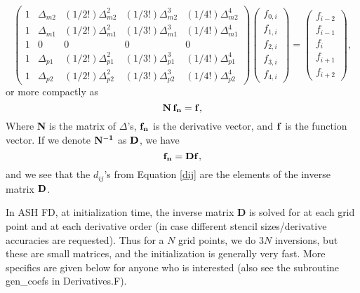\documentclass[12pt,letterpaper]{article}
\def\dfz{f_{0,i}}
\def\df{f_{1,i}}
\def\ddf{f_{2,i}}
\def\dddf{f_{3,i}}
\def\ddddf{f_{4,i}}
\begin{document}
\begin{equation}
\left( \begin{array}{ccccc} 
		1 & \Delta_{m2} & (1/2!)\Delta_{m2}^2 & (1/3!)\Delta_{m2}^3 & (1/4!)\Delta_{m2}^4 \\
		1 & \Delta_{m1} & (1/2!)\Delta_{m1}^2 & (1/3!)\Delta_{m1}^3 & (1/4!)\Delta_{m1}^4 \\
		1 & 0 & 0 & 0 & 0 \\
		1 & \Delta_{p1} & (1/2!)\Delta_{p1}^2 & (1/3!)\Delta_{p1}^3 & (1/4!)\Delta_{p1}^4 \\
		1 & \Delta_{p2} & (1/2!)\Delta_{p2}^2 & (1/3!)\Delta_{p2}^3 & (1/4!)\Delta_{p2}^4
\end{array} \right) 
\left( \begin{array}{c} 
\dfz \\ 
\df \\ 
\ddf \\ 
\dddf \\
\ddddf 
\end{array} \right)
=
\left( \begin{array}{c} 
f_{i-2} \\ 
f_{i-1} \\ 
f_{i} \\ 
f_{i+1} \\
f_{i+2} 
\end{array} \right),
\label{main_matrix}
\end{equation}
or more compactly as
\begin{equation}
\bf N\, f_n = f,
\end{equation}
Where \textbf{N} is the matrix of $\Delta$'s, $\bf f_n$ is the derivative vector, and $\bf f$ is the function vector.  If we denote $\bf N^{-1}$ as $\bf D$, we have
\begin{equation}
\bf f_n = D f,
\end{equation}
and we see that the $d_{ij}$'s from Equation \ref{dij} are the elements of the inverse matrix $\bf D$.

In ASH FD, at initialization time, the inverse matrix {\bf D} is solved for at each grid point and at each derivative order (in case different stencil sizes/derivative accuracies are requested). Thus for a $N$ grid points, we do $3N$ inversions, but these are small matrices, and the initialization is generally very fast.  More specifics are given below for anyone who is interested (also see the subroutine gen\_coefs in Derivatives.F).
\end{document}
